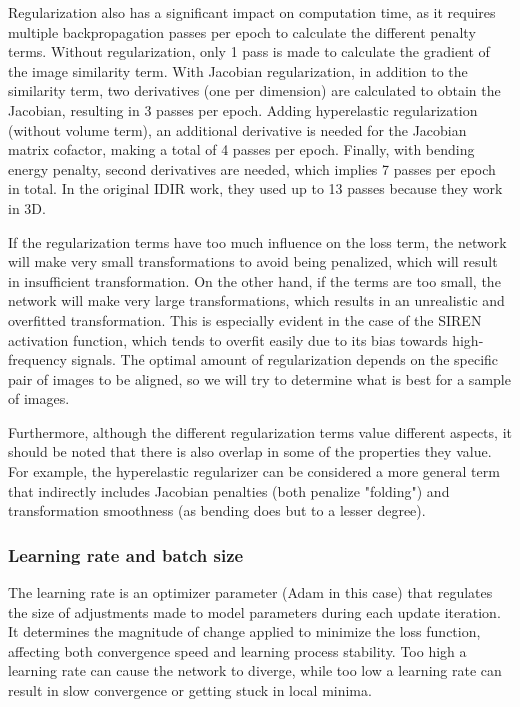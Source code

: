 Regularization also has a significant impact on computation time, as it requires multiple backpropagation passes per epoch to calculate the different penalty terms.
Without regularization, only 1 pass is made to calculate the gradient of the image similarity term.
With Jacobian regularization, in addition to the similarity term, two derivatives (one per dimension) are calculated to obtain the Jacobian, resulting in 3 passes per epoch.
Adding hyperelastic regularization (without volume term), an additional derivative is needed for the Jacobian matrix cofactor, making a total of 4 passes per epoch.
Finally, with bending energy penalty, second derivatives are needed, which implies 7 passes per epoch in total.
In the original IDIR work, they used up to 13 passes because they work in 3D.

If the regularization terms have too much influence on the loss term, the network will make very small transformations to avoid being penalized, which will result in insufficient transformation.
On the other hand, if the terms are too small, the network will make very large transformations, which results in an unrealistic and overfitted transformation. This is especially evident in the case of the SIREN activation function, which tends to overfit easily due to its bias towards high-frequency signals.
The optimal amount of regularization depends on the specific pair of images to be aligned, so we will try to determine what is best for a sample of images.

Furthermore, although the different regularization terms value different aspects, it should be noted that there is also overlap in some of the properties they value.
For example, the hyperelastic regularizer can be considered a more general term that indirectly includes Jacobian penalties (both penalize "folding") and transformation smoothness (as bending does but to a lesser degree).

\subsubsection{Learning rate and batch size}
\label{subsubsec:Learning rate and batch size}

The learning rate is an optimizer parameter (Adam in this case) that regulates the size of adjustments made to model parameters during each update iteration.
It determines the magnitude of change applied to minimize the loss function, affecting both convergence speed and learning process stability.
Too high a learning rate can cause the network to diverge, while too low a learning rate can result in slow convergence or getting stuck in local minima.

